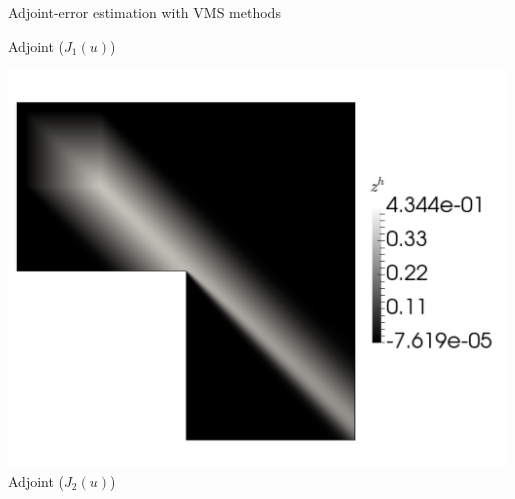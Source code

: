 \documentclass[fleqn]{beamer}
\begin{document}
\begin{frame}{Adjoint-error estimation with VMS methods}
\begin{minipage}{0.33\textwidth}
Adjoint ($J_1(u)$)
\end{minipage}%
\begin{minipage}{0.33\textwidth}
\centering
\includegraphics[width=0.99\textwidth]{../img/vms_lshape_square_zh} \\
Adjoint ($J_2(u)$)
\end{minipage}
\end{frame}

\end{document}
